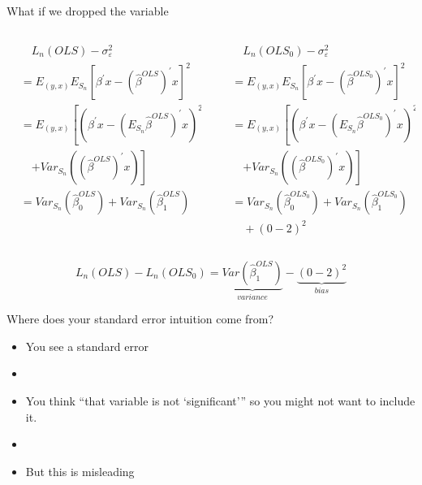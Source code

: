 \documentclass{beamer}
\begin{document}
\begin{frame}{What if we dropped the variable}
	\begin{columns}
		\begin{column}[t]{0.5\textwidth}
			\begin{equation*}
			   \begin{aligned}
			   	    &\quad L_n(OLS)-\sigma_\varepsilon^2\\
			   	    &=E_{(y,x)}E_{S_n}\left[ \beta^{'}x-(\hat{\beta}^{OLS})^{'}x\right]^2 \\
			   	    &=E_{(y,x)}\left[ \left(\beta^{'}x-(E_{S_n}\hat{\beta}^{OLS})^{'}x\right)^2\right.\\
			   	    &\quad\left.+Var_{S_n}\left((\hat{\beta}^{OLS})^{'}x\right) \right]\\
			   	    &=Var_{S_n}\left(\hat{\beta}_0^{OLS}\right)+Var_{S_n}\left(\hat{\beta}_1^{OLS}\right)
			   \end{aligned}
			\end{equation*}
		\end{column}
		\begin{column}[t]{0.5\textwidth}
			\begin{equation*}
			    \begin{aligned}
				&\quad L_n(OLS_0)-\sigma_\varepsilon^2\\
				&=E_{(y,x)}E_{S_n}\left[ \beta^{'}x-(\hat{\beta}^{OLS_0})^{'}x\right]^2 \\
				&=E_{(y,x)}\left[ \left(\beta^{'}x-(E_{S_n}\hat{\beta}^{OLS_0})^{'}x\right)^2\right.\\
				&\quad\left.+Var_{S_n}\left((\hat{\beta}^{OLS_0})^{'}x\right) \right]\\
				&=Var_{S_n}\left(\hat{\beta}_0^{OLS_0}\right)+Var_{S_n}\left(\hat{\beta}_1^{OLS_0}\right) \\
				&\quad+ (0-2)^2
			\end{aligned}
		\end{equation*}
		\end{column}
	\end{columns}
	$$L_n(OLS)-L_n(OLS_0)=\underbrace{Var(\hat{\beta}_1^{OLS})}_{variance}-\underbrace{(0-2)^2}_{bias}$$
\end{frame}

\begin{frame}{Where does your standard error intuition come from?}
	\begin{itemize}
		\item You see a standard error
		\item[]
		\item You think “that variable is not ‘significant’” so you might not want to include it.
		\item[]
		\item But this is misleading
	\end{itemize}
\end{frame}
\end{document}
